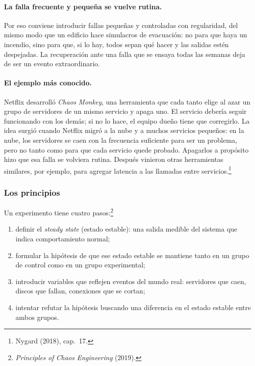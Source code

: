 \documentclass[variant=apuntes,cover=institutional,mode=screen]{ua-engineering-v6-article}
\begin{document}
\paragraph{La falla frecuente y pequeña se vuelve rutina.} Por eso conviene introducir fallas pequeñas y controladas con regularidad, del mismo modo que un edificio hace simulacros de evacuación: no para que haya un incendio, sino para que, si lo hay, todos sepan qué hacer y las salidas estén despejadas. La recuperación ante una falla que se ensaya todas las semanas deja de ser un evento extraordinario.

\paragraph{El ejemplo más conocido.} Netflix desarrolló \emph{Chaos Monkey}, una herramienta que cada tanto elige al azar un grupo de servidores de un mismo servicio y apaga uno. El servicio debería seguir funcionando con los demás; si no lo hace, el equipo dueño tiene que corregirlo. La idea surgió cuando Netflix migró a la nube y a muchos servicios pequeños: en la nube, los servidores se caen con la frecuencia suficiente para ser un problema, pero no tanto como para que cada servicio quede probado. Apagarlos a propósito hizo que esa falla se volviera rutina. Después vinieron otras herramientas similares, por ejemplo, para agregar latencia a las llamadas entre servicios.\footnote{Nygard (2018), cap.~17.}

\subsubsection{Los principios}\label{sec:principios-chaos}

Un experimento tiene cuatro pasos:\footnote{\emph{Principles of Chaos Engineering} (2019).}
\begin{enumerate}
\item definir el \emph{steady state} (estado estable): una salida medible del sistema que indica comportamiento normal;
\item formular la hipótesis de que ese estado estable se mantiene tanto en un grupo de control como en un grupo experimental;
\item introducir variables que reflejen eventos del mundo real: servidores que caen, discos que fallan, conexiones que se cortan;
\item intentar refutar la hipótesis buscando una diferencia en el estado estable entre ambos grupos.
\end{enumerate}
\end{document}
